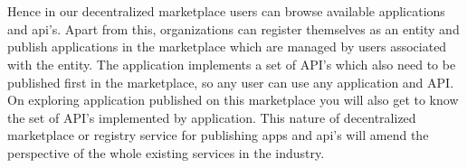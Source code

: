 \\
\\
Hence in our decentralized marketplace users can browse available applications and api's. Apart from this, organizations can register themselves as an entity and publish applications in the marketplace which are managed by users associated with the entity. The application implements a set of API's which also need to be published first in the marketplace, so any user can use any application and API. On exploring application published on this marketplace you will also get to know the set of API's implemented by application. This nature of decentralized marketplace or registry service for publishing apps and api's will amend the perspective of the whole existing services in the industry.
